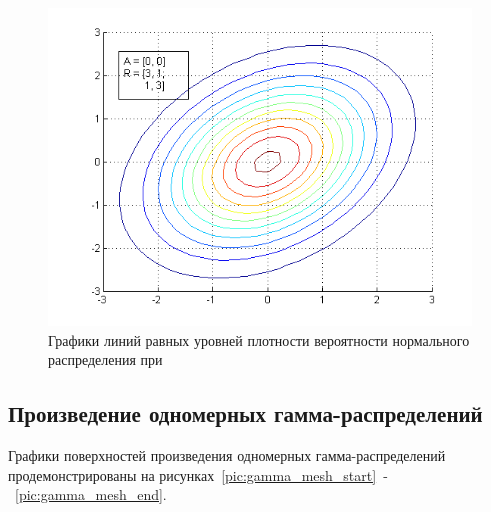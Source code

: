 \begin{figure}[h]
  \centering
  \includegraphics[width=0.58\linewidth]{../pic/new/normal_contour_3}
  \caption{Графики линий равных уровней плотности вероятности нормального распределения при }
  \label{pic:normal_contour_end}
\end{figure}

\newpage

\subsection{Произведение одномерных гамма-распределений}

Графики поверхностей произведения одномерных гамма-распределений продемонстрированы
на рисунках~\ref{pic:gamma_mesh_start}~-~\ref{pic:gamma_mesh_end}.

